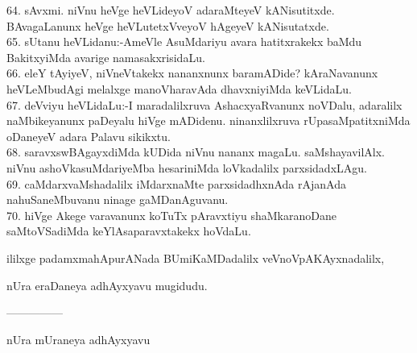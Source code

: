 \documentclass{article}
\begin{document}
64. sAvxmi. niVnu heVge heVLideyoV adaraMteyeV kANisutitxde. BAvagaLanunx heVge heVLutetxVveyoV hAgeyeV kANisutatxde.\\
65. sUtanu heVLidanu:-AmeVle AsuMdariyu avara hatitxrakekx baMdu BakitxyiMda avarige namasakxrisidaLu.\\
66. eleY tAyiyeV, niVneVtakekx nananxnunx baramADide? kAraNavanunx heVLeMbudAgi melalxge manoVharavAda dhavxniyiMda keVLidaLu.\\
67. deVviyu heVLidaLu:-I maradalilxruva AshacxyaRvanunx noVDalu, adaralilx naMbikeyanunx paDeyalu  hiVge mADidenu. ninanxlilxruva rUpasaMpatitxniMda oDaneyeV adara Palavu sikikxtu.\\
68. saravxswBAgayxdiMda kUDida niVnu nananx magaLu. saMshayavilAlx. niVnu ashoVkasuMdariyeMba hesariniMda loVkadalilx parxsidadxLAgu.\\
69. caMdarxvaMshadalilx iMdarxnaMte parxsidadhxnAda rAjanAda nahuSaneMbuvanu ninage gaMDanAguvanu.\\
70. hiVge Akege varavanunx koTuTx pAravxtiyu shaMkaranoDane saMtoVSadiMda keYlAsaparavxtakekx hoVdaLu.

\begin{center}
ililxge padamxmahApurANada BUmiKaMDadalilx veVnoVpAKAyxnadalilx,
\end{center}

\begin{center}
nUra eraDaneya adhAyxyavu mugidudu.
\end{center}

\begin{center}
---------------
\end{center}

\begin{center}
nUra mUraneya adhAyxyavu
\end{center}
\end{document}
